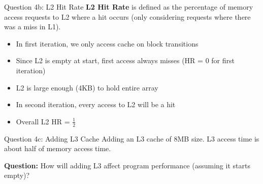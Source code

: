 \documentclass[aspectratio=169,12pt]{beamer}
\begin{document}
\begin{frame}{Question 4b: L2 Hit Rate}
\textbf{L2 Hit Rate} is defined as the percentage of memory access requests to L2 where a hit occurs (only considering requests where there was a miss in L1).

\begin{itemize}
    \item In first iteration, we only access cache on block transitions
    \item Since L2 is empty at start, first access always misses (HR = 0 for first iteration)
    \item L2 is large enough (4KB) to hold entire array
    \item In second iteration, every access to L2 will be a hit
    \item Overall L2 HR = $\frac{1}{2}$
\end{itemize}
\end{frame}

\begin{frame}{Question 4c: Adding L3 Cache}
Adding an L3 cache of 8MB size. L3 access time is about half of memory access time.

\textbf{Question:} How will adding L3 affect program performance (assuming it starts empty)?

\vspace{0.5cm}
\end{frame}
\end{document}
